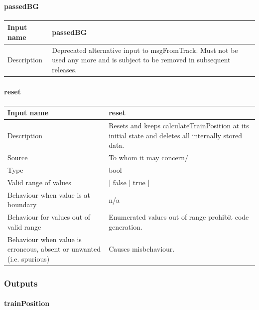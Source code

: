 \paragraph{passedBG}

\begin{longtable}{p{}p{}}
\toprule
Input name				& passedBG \\
\midrule
Description				& Deprecated alternative input to msgFromTrack. Must not be used any more and is subject to be removed in subsequent releases.  \\
\bottomrule
\end{longtable}


\paragraph{reset}

\begin{longtable}{p{}p{}}
\toprule
Input name				& reset \\
\midrule
Description				& Resets and keeps calculateTrainPosition at its initial state and deletes all internally stored data.  \\
\midrule
Source					& To whom it may concern/ \\ 
\midrule
Type					& bool \\  
\midrule
Valid range of values	& [ false | true ] \\
\midrule
Behaviour when value is at boundary	& n/a \\
\midrule
Behaviour for values out of valid range	& Enumerated values out of range prohibit code generation. \\
\midrule
Behaviour when value is erroneous, absent or unwanted (i.e. spurious) & Causes misbehaviour.
\\
\bottomrule
\end{longtable}


\subsubsection{Outputs}\label{s:calculateTrainPosition_outputs}

\paragraph{trainPosition}

